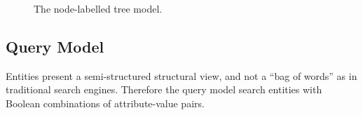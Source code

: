 \begin{figure}
\centering
{}\quad
{}
\caption{The node-labelled tree model.}
\end{figure}

\subsection{Query Model}
\label{sec:siren-query-model}

Entities present a semi-structured structural view, and not a ``bag of
words'' as in traditional search engines. Therefore the query model search
entities with Boolean combinations of attribute-value pairs.

